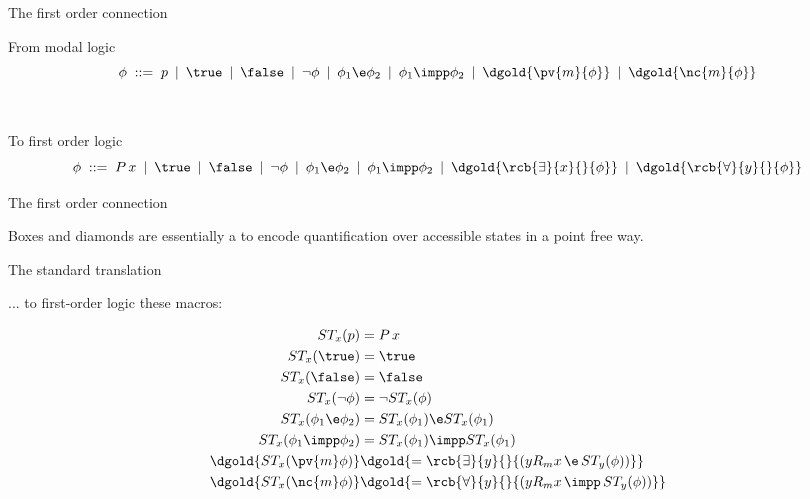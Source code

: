 \documentclass{beamer}
\begin{document}
\begin{slide}{The first order connection}\label{s:20}
\small

\begin{block}{From modal logic}
\vspace*{-3mm}
\begin{equation*}
\phi\; ::=\; p \: \mid\: \true\: \mid\: \false\: \mid\: \neg \phi \: \mid\: \phi_1 \e \phi_2\: \mid\:
           \phi_1 \impp  \phi_2\:   \mid\:
           \dgold{\pv{m}{\phi}} \:  \mid\:
           \dgold{\nc{m}{\phi}} 
\end{equation*}
\end{block}

~\\[5mm]

\begin{block}{To first order logic}
\vspace*{-3mm}
\begin{equation*}
\phi\; ::=\; P\,x \: \mid\: \true\: \mid\: \false\: \mid\: \neg \phi \: \mid\: \phi_1 \e \phi_2\: \mid\:
           \phi_1 \impp  \phi_2\: \mid\:
           \dgold{\rcb{\exists}{x}{}{\phi} } \: \mid\:
           \dgold{\rcb{\forall}{y}{}{\phi} }
\end{equation*}
\end{block}
\end{slide}


\begin{slide}{The first order connection}
\small

Boxes and diamonds are essentially a  to encode quantification over accessible states in a point free way. \\
\vspace{0.2cm}
\begin{block}{The standard translation}

... to first-order logic  these macros:

\begin{align*}
ST_x (p) & =  P\, x\\
ST_x (\true) & =  \true \\
ST_x (\false) & =  \false\\
ST_x (\neg \phi) & =  \neg ST_x (\phi)\\
ST_x (\phi_1 \e \phi_2) & =  ST_x (\phi_1) \e  ST_x (\phi_1)\\
ST_x (\phi_1 \impp \phi_2) & =  ST_x (\phi_1) \impp  ST_x (\phi_1)\\
\dgold{ST_x (\pv{m} \phi) }& \dgold{=  \rcb{\exists}{y}{}{(y R_m x\, \e\, ST_y(\phi))} }  \\
\dgold{ST_x (\nc{m} \phi) }& \dgold{=  \rcb{\forall}{y}{}{(y R_m x\, \impp\, ST_y(\phi))} }  \\
\end{align*}
\end{block}
\end{slide}
\end{document}
